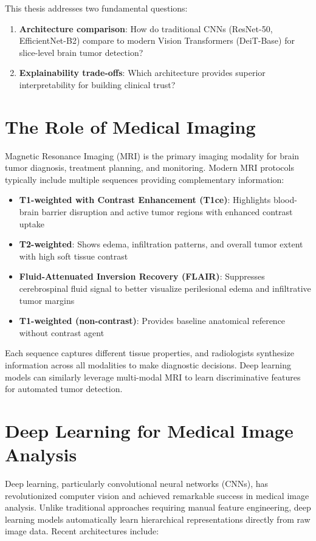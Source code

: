 This thesis addresses two fundamental questions:

\begin{enumerate}
    \item \textbf{Architecture comparison}: How do traditional CNNs (ResNet-50, EfficientNet-B2) compare to modern Vision Transformers (DeiT-Base) for slice-level brain tumor detection?
    \item \textbf{Explainability trade-offs}: Which architecture provides superior interpretability for building clinical trust?
\end{enumerate}

\section{The Role of Medical Imaging}

Magnetic Resonance Imaging (MRI) is the primary imaging modality for brain tumor diagnosis, treatment planning, and monitoring. Modern MRI protocols typically include multiple sequences providing complementary information:

\begin{itemize}
    \item \textbf{T1-weighted with Contrast Enhancement (T1ce)}: Highlights blood-brain barrier disruption and active tumor regions with enhanced contrast uptake
    \item \textbf{T2-weighted}: Shows edema, infiltration patterns, and overall tumor extent with high soft tissue contrast
    \item \textbf{Fluid-Attenuated Inversion Recovery (FLAIR)}: Suppresses cerebrospinal fluid signal to better visualize perilesional edema and infiltrative tumor margins
    \item \textbf{T1-weighted (non-contrast)}: Provides baseline anatomical reference without contrast agent
\end{itemize}

Each sequence captures different tissue properties, and radiologists synthesize information across all modalities to make diagnostic decisions. Deep learning models can similarly leverage multi-modal MRI to learn discriminative features for automated tumor detection.

\section{Deep Learning for Medical Image Analysis}

Deep learning, particularly convolutional neural networks (CNNs), has revolutionized computer vision and achieved remarkable success in medical image analysis. Unlike traditional approaches requiring manual feature engineering, deep learning models automatically learn hierarchical representations directly from raw image data. Recent architectures include:

